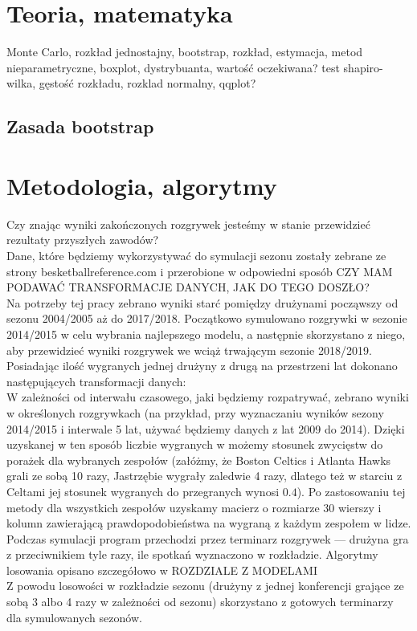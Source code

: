 \documentclass[inzynierska]{pwr_wmat_praca_dyplomowa}
\theoremstyle{plain}
\numberwithin{theorem}{chapter}
\theoremstyle{definition}
\numberwithin{theorem}{chapter}
\begin{document}
\chapter{Teoria, matematyka}
Monte Carlo, rozkład jednostajny, bootstrap, rozkład, estymacja, metod nieparametryczne, boxplot, dystrybuanta, wartość oczekiwana?
test shapiro-wilka, gęstość rozkładu, rozklad normalny, qqplot?

\section{Zasada bootstrap}


\chapter{Metodologia, algorytmy}
Czy znając wyniki zakończonych rozgrywek jesteśmy w stanie przewidzieć rezultaty przyszłych zawodów?
\\
Dane, które będziemy wykorzystywać do symulacji sezonu zostały zebrane ze strony besketballreference.com i przerobione w odpowiedni sposób CZY MAM PODAWAĆ TRANSFORMACJE DANYCH, JAK DO TEGO DOSZŁO?
\\
Na potrzeby tej pracy zebrano wyniki starć pomiędzy drużynami począwszy od sezonu 2004/2005 aż do 2017/2018. Początkowo symulowano rozgrywki w sezonie 2014/2015 w celu wybrania najlepszego modelu, a następnie skorzystano z niego, aby przewidzieć wyniki rozgrywek we wciąż trwającym sezonie 2018/2019.
Posiadając ilość wygranych jednej drużyny z drugą na przestrzeni lat dokonano następujących transformacji danych:
\\
W zależności od interwału czasowego, jaki będziemy rozpatrywać, zebrano wyniki w określonych rozgrywkach (na przykład, przy wyznaczaniu wyników sezony 2014/2015 i interwale 5 lat, używać będziemy danych z lat 2009 do 2014). Dzięki uzyskanej w ten sposób liczbie wygranych w możemy stosunek zwycięstw do porażek dla wybranych zespołów (załóżmy, że Boston Celtics i Atlanta Hawks grali ze sobą 10 razy, Jastrzębie wygrały zaledwie 4 razy, dlatego też w starciu z Celtami jej stosunek wygranych do przegranych wynosi $0.4$). Po zastosowaniu tej metody dla wszystkich zespołów uzyskamy macierz o rozmiarze 30 wierszy i kolumn zawierającą prawdopodobieństwa na wygraną z każdym zespołem w lidze.
\\
Podczas symulacji program przechodzi przez terminarz rozgrywek --- drużyna gra z przeciwnikiem tyle razy, ile spotkań wyznaczono w rozkładzie. Algorytmy losowania opisano szczegółowo w ROZDZIALE Z MODELAMI
\\
Z powodu losowości w rozkładzie sezonu (drużyny z jednej konferencji grające ze sobą 3 albo 4 razy w zależności od sezonu) skorzystano z gotowych terminarzy dla symulowanych sezonów.
\\
\end{document}
